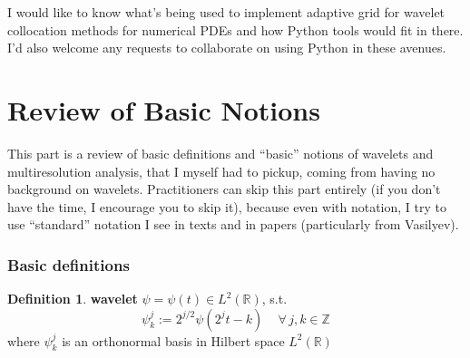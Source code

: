 \documentclass[twoside]{amsart}
\theoremstyle{plain}
\theoremstyle{definition}
\newtheorem{definition}{Definition}
\theoremstyle{remark}
\numberwithin{equation}{section}
\begin{document}
I would like to know what's being used to implement adaptive grid for wavelet collocation methods for numerical PDEs and how Python tools would fit in there.  I'd also welcome any requests to collaborate on using Python in these avenues.    



\part{Review of Basic Notions}

This part is a review of basic definitions and ``basic'' notions of wavelets and multiresolution analysis, that I myself had to pickup, coming from having no background on wavelets.  Practitioners can skip this part entirely (if you don't have the time, I encourage you to skip it), because even with notation, I try to use ``standard'' notation I see in texts and in papers (particularly from Vasilyev).  

\section{Basic definitions}

\begin{definition}
  \textbf{wavelet } $\psi = \psi(t) \in L^2(\mathbb{R})$, s.t. 
\begin{equation}
  \psi^j_k := 2^{j/2} \psi(2^jt-k) \quad \, \forall \, j,k \in \mathbb{Z}
\end{equation}
where $\psi^j_k$ is an orthonormal basis in Hilbert space $L^2(\mathbb{R})$
\end{definition}
\end{document}
